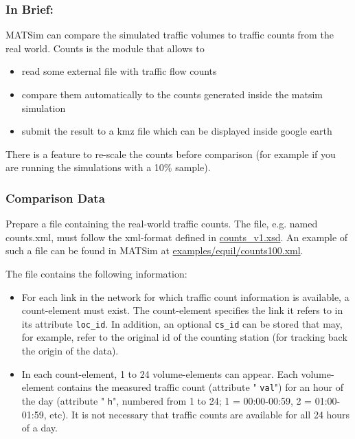 \subsubsection{\textbf{In Brief:}}

MATSim can compare the simulated traffic volumes to traffic counts from the real world. Counts is the module that allows to
\begin{itemize}
	\item read some external file with traffic flow counts
	\item compare them automatically to the counts generated inside the matsim simulation
	\item submit the result to a kmz file which can be displayed inside google earth
\end{itemize}

There is a feature to re-scale the counts before comparison (for example if you are running the simulations with a 10\% sample).

\subsubsection{Comparison Data}

Prepare a file containing the real-world traffic counts. The file, e.g. named counts.xml, must follow the xml-format defined in \href{http://matsim.org/files/dtd/counts_v1.xsd}{counts\_v1.xsd}. An example of such a file can be found in MATSim at \href{http://matsim.svn.sourceforge.net/viewvc/matsim/matsim/trunk/examples/equil/counts100.xml?content-type=text%2Fplain}{examples/equil/counts100.xml}.

The file contains the following information:
\begin{itemize}
	\item For each link in the network for which traffic count information  is available, a count-element must exist. The count-element specifies  the link it refers to in its attribute 
\texttt{loc\_id}. In addition, an optional 
\texttt{cs\_id}  can be stored that may, for example, refer to the original id of the  counting station (for tracking back the origin of the data).
	\item In each count-element, 1 to 24 volume-elements can appear. Each volume-element contains the measured traffic count (attribute "
\texttt{val}") for an hour of the day (attribute "
\texttt{h}",  numbered from 1 to 24; 1 = 00:00-00:59, 2 = 01:00-01:59, etc). It is  not necessary that traffic counts are available for all 24 hours of a  day.
\end{itemize}


